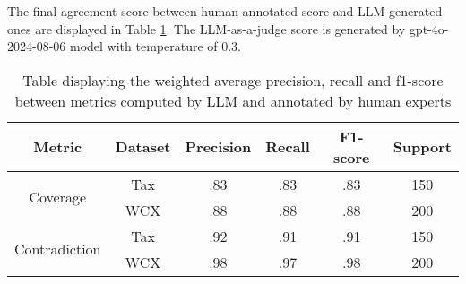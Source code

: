 The final agreement score between human-annotated score and LLM-generated ones are displayed in Table \ref{table: agreement_metric}. The LLM-as-a-judge score is generated by gpt-4o-2024-08-06 model with temperature of 0.3.

\begin{table}[H]
\centering

\caption{Table displaying the weighted average precision, recall and f1-score between metrics computed by LLM and annotated by human experts}
\label{table: agreement_metric}

\begin{tabular}{@{}c|ccccc@{}}
\toprule
Metric                         & Dataset & Precision & Recall & F1-score & Support \\ \midrule
\multirow{2}{*}{Coverage}      & Tax     & .83       & .83    & .83      & 150     \\
                               & WCX     & .88       & .88    & .88      & 200     \\ \midrule
\multirow{2}{*}{Contradiction} & Tax     & .92       & .91    & .91      & 150     \\
                               & WCX     & .98       & .97    & .98      & 200     \\ \bottomrule
\end{tabular}

\end{table}
